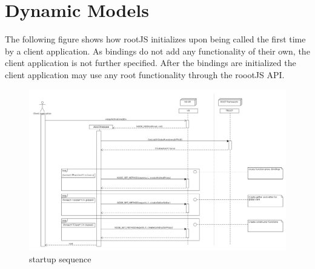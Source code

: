 \pagebreak[4]

\section{Dynamic Models}
The following figure shows how rootJS initializes upon being called the first time by a client application. As bindings do not add any functionality of their own, the client application is not further specified. After the bindings are initialized the client application may use any root functionality through the roootJS API.
\begin{figure}[htb]
	\centering
	\includegraphics[width=18cm]{./latex/resources/startupSequence.png}
	\caption{startup sequence}
\end{figure}
